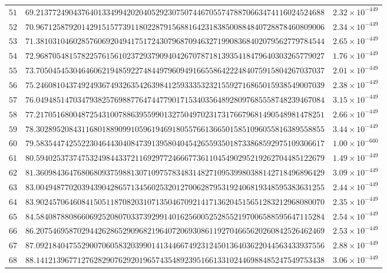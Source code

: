 \documentclass[12pt,reqno]{amsart}
\theoremstyle{remark}
\begin{document}
\begin{longtable}{clc}
$51$ & $69.2137724904376401334994202040529230750744670557478870663474116024524688$ & $2.32\times 10^{-449}$ \\
$52$ & $70.9671258792014291515773911802287915688164231838500884840728878460809006$ & $2.34\times 10^{-449}$ \\
$53$ & $71.3810310460285760692049417517243079687094632719908368402079562779784544$ & $2.65\times 10^{-449}$ \\
$54$ & $72.9687054815782257615610237293790940426707871813935418479640303265779027$ & $1.76\times 10^{-449}$ \\
$55$ & $73.7050454530464606219485922748449796094916655864222484075915804267037037$ & $2.01\times 10^{-449}$ \\
$56$ & $75.2460810437492493674932635426398412593335323215592716865015938549007039$ & $2.38\times 10^{-449}$ \\
$57$ & $76.0494851470347938257698877647447790171534035648928097685558748239467084$ & $3.15\times 10^{-449}$ \\
$58$ & $77.2170516800487254310078863955990132750497023173176679681490548981478251$ & $2.66\times 10^{-449}$ \\
$59$ & $78.3028952084311680188909910596194691805576613665015851096055816389558855$ & $3.44\times 10^{-449}$ \\
$60$ & $79.5835447425522304644304084739139580404542655935018733868592975109306617$ & $1.00\times 10^{-660}$ \\
$61$ & $80.5940253737475324984433721169297724666773611045490295219262704485122679$ & $1.49\times 10^{-449}$ \\
$62$ & $81.3609843647680680937598813071097578348314827109539980388142718496896429$ & $3.09\times 10^{-449}$ \\
$63$ & $83.0049487702039439042865713456025320127006287953192406819348595383631255$ & $2.44\times 10^{-449}$ \\
$64$ & $83.9024570646084150511870820310713504670921417136204515651283212968080070$ & $2.35\times 10^{-449}$ \\
$65$ & $84.5840878808660692520807033739299140162560052528552197006588595647115284$ & $2.54\times 10^{-449}$ \\
$66$ & $86.2075469587029442628652909682196407206930861192704665620260842526462469$ & $2.53\times 10^{-449}$ \\
$67$ & $87.0921840475529007060583203990141344667492312450136403622044563433937556$ & $2.88\times 10^{-449}$ \\
$68$ & $88.1412139677127628290762920196574354892395166133102446988485247549753438$ & $3.06\times 10^{-449}$ \\

\end{longtable}
\end{document}
